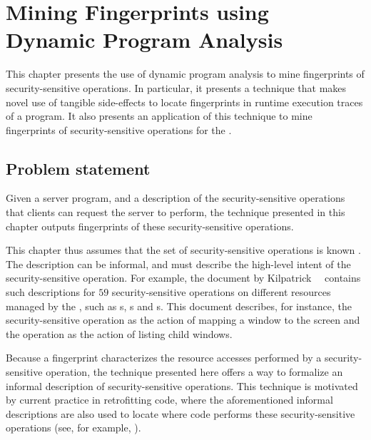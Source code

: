\chapter{Mining Fingerprints using Dynamic Program Analysis}
\label{chapter:dynamic}

This chapter presents the use of dynamic program analysis to mine fingerprints
of security-sensitive operations. In particular, it presents a technique that
makes novel use of tangible side-effects to locate fingerprints in runtime
execution traces of a program. It also presents an application of this
technique to mine fingerprints of security-sensitive operations for the
\xserver.

\section{Problem statement}
\label{chapter:dynamic:problem}

Given a server program, and a description of the security-sensitive operations
that clients can request the server to perform, the technique presented in this
chapter outputs fingerprints of these security-sensitive operations. 

This chapter thus assumes that the set of security-sensitive operations is
known \apriori. The description can be informal, and must describe the
high-level intent of the security-sensitive operation.  For example, the
document by Kilpatrick~\etal~\cite{ksv03} contains such descriptions for $59$
security-sensitive operations on different resources managed by the \xserver,
such as s, s and s. This document
describes, for instance, the  security-sensitive operation as
the action of mapping a window to the screen and the  
operation as the action of listing child windows.

Because a fingerprint characterizes the resource accesses performed by a
security-sensitive operation, the technique presented here offers a way to
formalize an informal description of security-sensitive operations. This
technique is motivated by current practice in retrofitting code, where the
aforementioned informal descriptions are also used to locate where code
performs these security-sensitive operations (see, for example,
\cite[Sections~5.2 and~5.3]{ksv03}). 


